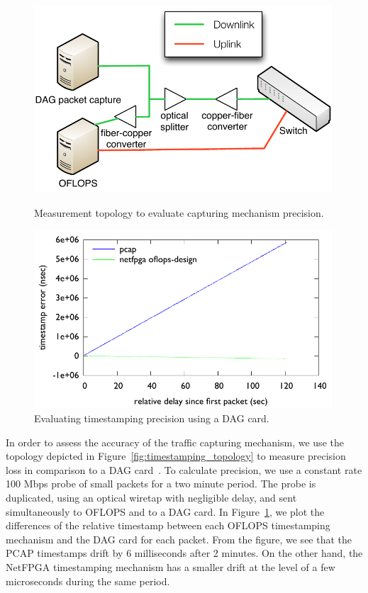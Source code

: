 \begin{figure}
\centering
  \begin{minipage}[b]{0.45\textwidth}
\centering
 \includegraphics[width=0.99\textwidth]{accuracy-topology} 
 \caption{Measurement topology to evaluate capturing mechanism precision.}
\label{fig:timestamping_topology}
\end{minipage}
\hspace{0.5cm}
  \begin{minipage}[b]{0.45\textwidth}
\centering
 \includegraphics[width=0.99\textwidth]{timer_precision} 
 \caption{Evaluating timestamping precision using a DAG card.}
\label{fig:timestamping}
\end{minipage}
\end{figure}

In order to assess the accuracy of the traffic capturing mechanism, we use the
topology depicted in Figure~\ref{fig:timestamping_topology} to measure precision
loss in comparison to a DAG card~\cite{dag_card}.  To calculate precision, we
use a constant rate 100 Mbps probe of small packets for a two minute period. The
probe is duplicated, using an optical wiretap with negligible delay, and sent
simultaneously to OFLOPS and to a DAG card. In Figure~\ref{fig:timestamping}, we
plot the differences of the relative timestamp between each OFLOPS timestamping
mechanism and the DAG card for each packet. From the figure, we see that the
PCAP timestamps drift by 6 milliseconds after 2 minutes.  On the other hand, the
NetFPGA timestamping mechanism has a smaller drift at the level of a few
microseconds during the same period.

